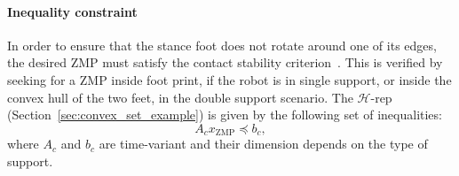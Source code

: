 \paragraph{Inequality constraint}
In order to ensure that the stance foot does not rotate around one of its edges, the desired ZMP must satisfy the contact stability criterion~\citep{Vukobratovic1969,vukobratovic2004zero}. This is verified by seeking for a ZMP inside foot print, if the robot is in single support, or inside the convex hull of the two feet, in the double support scenario. The $\mathcal{H}$-rep (Section~\ref{sec:convex_set_example}) is given by the following set of inequalities:
\begin{equation}
\label{eq:inequality_constraints_simplified}
A_{c} x_{\text{ZMP}} \preceq b_{c},
\end{equation}
where $A_{c}$ and $b_{c}$ are time-variant and their dimension depends on the type of support.

